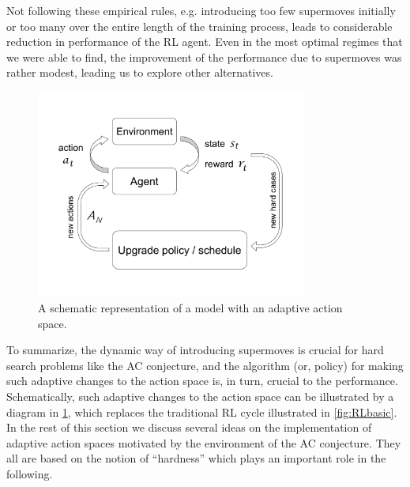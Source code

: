 \noindent
Not following these empirical rules, e.g. introducing too few supermoves initially or too many over the entire length of the training process, leads to considerable reduction in performance of the RL agent. Even in the most optimal regimes that we were able to find, the improvement of the performance due to supermoves was rather modest, leading us to explore other alternatives.

\begin{figure}[ht]
	\centering
	\includegraphics[trim={0.5in 1.1in 0.5in 1.0in},clip,width=3.5in]{fig/DynamicActions.pdf}
	\caption{A schematic representation of a model with an adaptive action space.}
	\label{fig:dynamicactions}
\end{figure}

To summarize, the dynamic way of introducing supermoves is crucial for hard search problems like the AC conjecture, and the algorithm (or, policy) for making such adaptive changes to the action space is, in turn, crucial to the performance. Schematically, such adaptive changes to the action space can be illustrated by a diagram in \cref{fig:dynamicactions}, which replaces the traditional RL cycle illustrated in \cref{fig:RLbasic}. In the rest of this section we discuss several ideas on the implementation of adaptive action spaces motivated by the environment of the AC conjecture. They all are based on the notion of ``hardness'' which plays an important role in the following.

